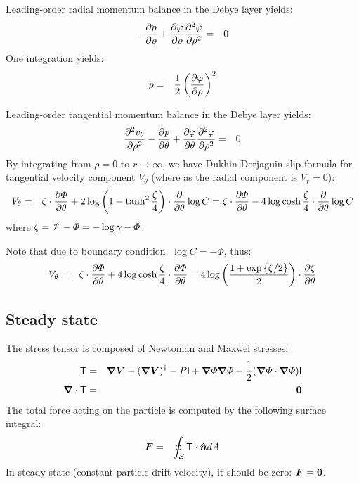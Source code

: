 Leading-order radial momentum balance in the Debye layer yields:
\begin{eqnarray} \nonumber
- \frac{\partial p}{\partial \rho} + \frac{\partial \varphi}{\partial \rho} \frac{\partial ^2\varphi}{\partial \rho^2} &=& 0
\end{eqnarray}
One integration yields:
\begin{eqnarray} \nonumber
p &=& \frac{1}{2}\left(\frac{\partial \varphi}{\partial \rho}\right)^2
\end{eqnarray}

Leading-order tangential momentum balance in the Debye layer yields:
\begin{eqnarray} \nonumber
\frac{\partial ^2 v_\theta}{\partial \rho^2} - \frac{\partial p}{\partial \theta} 
 + \frac{\partial \varphi}{\partial \theta} \frac{\partial ^2\varphi}{\partial \rho^2} &=& 0
\end{eqnarray}
By integrating from $\rho = 0$ to $r \rightarrow \infty$, we have Dukhin-Derjaguin slip formula
for tangential velocity component $V_\theta$ (where as the radial component is $V_r = 0$):
\begin{eqnarray}
V_\theta &=& \zeta \cdot \frac{\partial \varPhi}{\partial \theta} + 
      2\log\left(1 - \tanh^2 \frac{\zeta}{4}\right) \cdot \frac{\partial }{\partial \theta} \log C 
 = \zeta \cdot \frac{\partial \varPhi}{\partial \theta} -
      4\log\cosh \frac{\zeta}{4} \cdot \frac{\partial }{\partial \theta} \log C
\end{eqnarray}
where $\zeta = \mathscr{V} - \varPhi = -\log\gamma - \varPhi$.

Note that due to boundary condition, $\log C = -\varPhi$, thus:
\begin{eqnarray}
V_\theta &=& \zeta \cdot \frac{\partial \varPhi}{\partial \theta} + 
      4\log\cosh \frac{\zeta}{4} \cdot \frac{\partial \varPhi}{\partial \theta} = 
4\log\left(\frac{1 + \exp\left\{\zeta/2\right\}}{2}\right) \cdot \frac{\partial \zeta}{\partial \theta}
\end{eqnarray}

\subsection{Steady state}
The stress tensor is composed of Newtonian and Maxwel stresses:
\begin{eqnarray}
\mathsf{T} &=& \boldsymbol{\nabla} \boldsymbol{V} + (\boldsymbol{\nabla} \boldsymbol{V})^\dagger - P \mathsf{I}
+ \boldsymbol{\nabla} \varPhi \boldsymbol{\nabla} \varPhi - \frac{1}{2} (\boldsymbol{\nabla} \varPhi \cdot \boldsymbol{\nabla} \varPhi) \mathsf{I} \\
\boldsymbol{\nabla} \cdot \mathsf{T} &=& \boldsymbol{0}
\end{eqnarray}
The total force acting on the particle is computed by the following surface integral:
\begin{eqnarray}
\boldsymbol{F} &=& \oint_\mathcal{S} \mathsf{T} \cdot \hat{\boldsymbol{n}}  dA 
\end{eqnarray}
In steady state (constant particle drift velocity), it should be zero: $\boldsymbol{F} = \boldsymbol{0}$.
